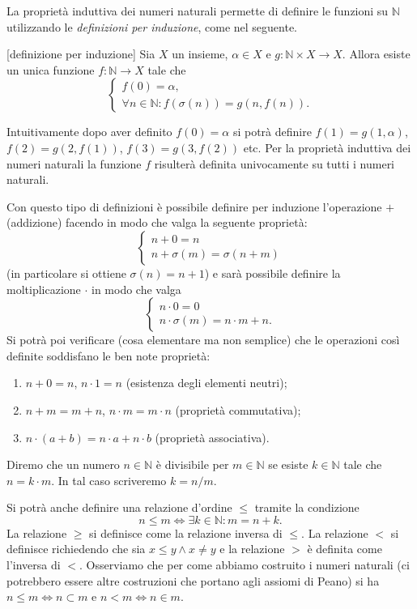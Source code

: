 \documentclass[italian,a4paper,hidelinks]{scrartcl}
\newcommand{\NN}{{\mathbb N}}
\begin{document}
La proprietà induttiva dei numeri naturali permette di definire le funzioni su
$\NN$ utilizzando le \emph{definizioni per induzione}, come nel seguente.
\begin{theorem}\label{th:def_induction}[definizione per induzione]
Sia $X$ un insieme, $\alpha \in X$ e $g\colon \NN\times X \to X$.
Allora esiste un unica funzione $f\colon \NN \to X$ tale che
\[
\begin{cases}
  f(0) = \alpha,\\
  \forall n\in \NN\colon f(\sigma(n)) = g(n, f(n)).
\end{cases}
\]
\end{theorem}

Intuitivamente dopo aver definito $f(0) = \alpha$ si potrà definire
$f(1) = g(1, \alpha)$, $f(2) = g(2, f(1))$, $f(3) = g(3, f(2))$ etc.
Per la proprietà induttiva dei numeri naturali la funzione $f$ risulterà
definita univocamente su tutti i numeri naturali.

Con questo tipo di definizioni è possibile definire per induzione
l'operazione $+$ (addizione)
facendo in modo che valga la seguente proprietà:
\[
\begin{cases}
  n + 0 = n\\
  n + \sigma(m) = \sigma(n+m)
\end{cases}
\]
(in particolare si ottiene $\sigma(n)=n+1$)
e sarà possibile definire la moltiplicazione $\cdot$ in modo che
valga
\[
\begin{cases}
  n\cdot 0 = 0 \\
  n \cdot \sigma(m) = n\cdot m + n.
\end{cases}
\]
Si potrà poi verificare (cosa elementare ma non semplice)
che le operazioni così definite soddisfano le ben
note proprietà:
\begin{enumerate}
\item $n+0=n$, $n\cdot 1 = n$ (esistenza degli elementi neutri);
\item $n+m = m+n$, $n\cdot m = m\cdot n$ (proprietà commutativa);
\item $n\cdot (a+b) = n\cdot a + n\cdot b$ (proprietà associativa).
\end{enumerate}

Diremo che un numero $n\in \NN$ è divisibile per $m\in \NN$ se esiste $k\in \NN$
tale che $n = k \cdot m$. In tal caso scriveremo $k = n/m$.

Si potrà anche definire una relazione d'ordine $\le$ tramite la condizione
\[
  n \le m \iff \exists k \in \NN \colon m = n+k.
\]
La relazione $\ge$ si definisce come la relazione inversa di $\le$.
La relazione $<$ si
definisce richiedendo che sia $x\le y \land x\neq y$ e la relazione $>$
è definita come l'inversa di $<$.
Osserviamo che per come abbiamo costruito i numeri naturali (ci potrebbero essere
altre costruzioni che portano agli assiomi di Peano) si ha $n\le m \iff n \subset m$
e $n < m \iff n\in m$.
\end{document}
